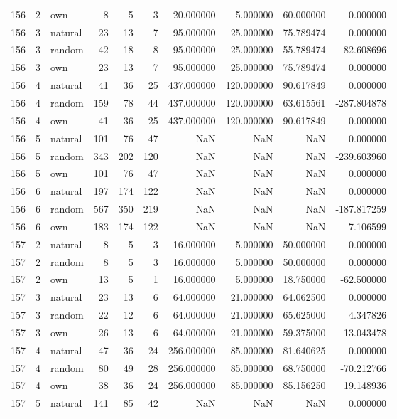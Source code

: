 \begin{table}[htbp]
\begin{tabular}{rrlrrrrrrr}
156 & 2 & own & 8 & 5 & 3 & 20.000000 & 5.000000 & 60.000000 & 0.000000 \\
156 & 3 & natural & 23 & 13 & 7 & 95.000000 & 25.000000 & 75.789474 & 0.000000 \\
156 & 3 & random & 42 & 18 & 8 & 95.000000 & 25.000000 & 55.789474 & -82.608696 \\
156 & 3 & own & 23 & 13 & 7 & 95.000000 & 25.000000 & 75.789474 & 0.000000 \\
156 & 4 & natural & 41 & 36 & 25 & 437.000000 & 120.000000 & 90.617849 & 0.000000 \\
156 & 4 & random & 159 & 78 & 44 & 437.000000 & 120.000000 & 63.615561 & -287.804878 \\
156 & 4 & own & 41 & 36 & 25 & 437.000000 & 120.000000 & 90.617849 & 0.000000 \\
156 & 5 & natural & 101 & 76 & 47 & NaN & NaN & NaN & 0.000000 \\
156 & 5 & random & 343 & 202 & 120 & NaN & NaN & NaN & -239.603960 \\
156 & 5 & own & 101 & 76 & 47 & NaN & NaN & NaN & 0.000000 \\
156 & 6 & natural & 197 & 174 & 122 & NaN & NaN & NaN & 0.000000 \\
156 & 6 & random & 567 & 350 & 219 & NaN & NaN & NaN & -187.817259 \\
156 & 6 & own & 183 & 174 & 122 & NaN & NaN & NaN & 7.106599 \\
157 & 2 & natural & 8 & 5 & 3 & 16.000000 & 5.000000 & 50.000000 & 0.000000 \\
157 & 2 & random & 8 & 5 & 3 & 16.000000 & 5.000000 & 50.000000 & 0.000000 \\
157 & 2 & own & 13 & 5 & 1 & 16.000000 & 5.000000 & 18.750000 & -62.500000 \\
157 & 3 & natural & 23 & 13 & 6 & 64.000000 & 21.000000 & 64.062500 & 0.000000 \\
157 & 3 & random & 22 & 12 & 6 & 64.000000 & 21.000000 & 65.625000 & 4.347826 \\
157 & 3 & own & 26 & 13 & 6 & 64.000000 & 21.000000 & 59.375000 & -13.043478 \\
157 & 4 & natural & 47 & 36 & 24 & 256.000000 & 85.000000 & 81.640625 & 0.000000 \\
157 & 4 & random & 80 & 49 & 28 & 256.000000 & 85.000000 & 68.750000 & -70.212766 \\
157 & 4 & own & 38 & 36 & 24 & 256.000000 & 85.000000 & 85.156250 & 19.148936 \\
157 & 5 & natural & 141 & 85 & 42 & NaN & NaN & NaN & 0.000000 \\

\end{tabular}
\end{table}
